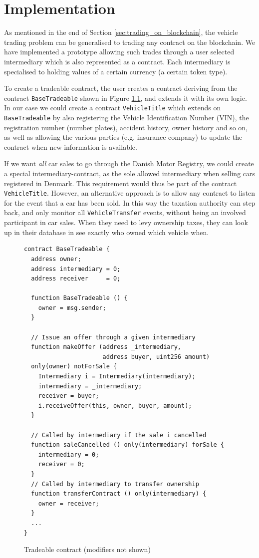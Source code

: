 \documentclass[oneside,a4paper,10pts,article]{memoir}
\begin{document}
\chapter{Implementation}
\label{sec:implementation}
As mentioned in the end of Section \ref{sec:trading_on_blockchain},
the vehicle trading problem can be generalised to trading any contract
on the blockchain. We have implemented a prototype allowing such
trades through a user selected intermediary which is also represented
as a contract. Each intermediary is specialised to holding values of a
certain currency (a certain token type).

To create a tradeable contract, the user creates a contract deriving
from the contract \texttt{BaseTradeable} shown in Figure
\ref{fig:tradeable}, and extends it with its own logic. In our case we
could create a contract \texttt{VehicleTitle} which extends on
\texttt{BaseTradeable} by also registering the Vehicle Identification
Number (VIN), the registration number (number plates), accident
history, owner history and so on, as well as allowing the various
parties (e.g. insurance company) to update the contract when new
information is available.

If we want \emph{all} car sales to go through the Danish Motor
Registry, we could create a special intermediary-contract, as the sole
allowed intermediary when selling cars registered in Denmark. This
requirement would thus be part of the contract
\texttt{VehicleTitle}. However, an alternative approach is to allow
any contract to listen for the event that a car has been sold. In this
way the taxation authority can step back, and only monitor all
\texttt{VehicleTransfer} events, without being an involved participant
in car sales. When they need to levy ownership taxes, they can look up
in their database in see exactly who owned which vehicle when.

\begin{figure}
\begin{lstlisting}
contract BaseTradeable {
  address owner;
  address intermediary = 0;
  address receiver     = 0;

  function BaseTradeable () {
    owner = msg.sender;
  }

  // Issue an offer through a given intermediary  
  function makeOffer (address _intermediary,
                      address buyer, uint256 amount)
  only(owner) notForSale {
    Intermediary i = Intermediary(intermediary);
    intermediary = _intermediary;
    receiver = buyer;
    i.receiveOffer(this, owner, buyer, amount);
  }

  // Called by intermediary if the sale i cancelled
  function saleCancelled () only(intermediary) forSale {
    intermediary = 0;
    receiver = 0;
  }
  // Called by intermediary to transfer ownership
  function transferContract () only(intermediary) {
    owner = receiver;
  }
  ...
}
\end{lstlisting}

\caption{Tradeable contract (modifiers not shown)}
\label{fig:tradeable}
\end{figure}
\end{document}
